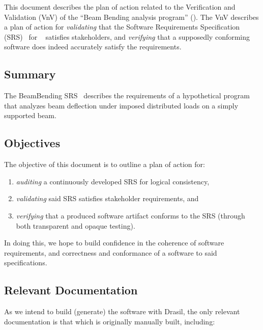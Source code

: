 \documentclass[12pt, titlepage]{article}
\begin{document}
This document describes the plan of action related to the Verification and
Validation (VnV) of the ``Beam Bending analysis program'' (\progname{}). The VnV
describes a plan of action for \textit{validating} that the Software
Requirements Specification (SRS)~\cite{SmithAndLai2005} for
\progname{}~\cite{BalaciBeamBendingSRS2023} satisfies stakeholders, and
\textit{verifying} that a supposedly conforming software does indeed accurately
satisfy the requirements.

\subsection{Summary}

The BeamBending SRS~\cite{BalaciBeamBendingSRS2023} describes the requirements
of a hypothetical program that analyzes beam deflection under imposed
distributed loads on a simply supported beam.

\subsection{Objectives}

The objective of this document is to outline a plan of action for:

\begin{enumerate}

    \item \textit{auditing} a continuously developed SRS
          \cite{ParnasAndClements1986} for logical consistency,

    \item \textit{validating} said SRS satisfies stakeholder requirements, and

    \item \textit{verifying} that a produced software artifact conforms to the
          SRS (through both transparent and opaque testing).

\end{enumerate}

In doing this, we hope to build confidence in the coherence of software
requirements, and correctness and conformance of a software to said
specifications.

\subsection{Relevant Documentation}

As we intend to build (generate) the software with Drasil, the only relevant
documentation is that which is originally manually built, including:
\end{document}
